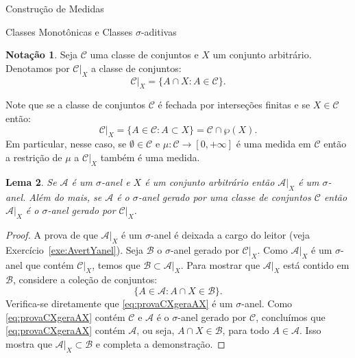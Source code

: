\documentclass[oneside,final,11pt]{amsbook}
\theoremstyle{remark}\newtheorem{exercise}{Exercício}[chapter]
\theoremstyle{remark}\newtheorem{*exercise}[exercise]{\hbox to 0pt{\hskip 0pt minus 1fil*}Exercício}
\theoremstyle{definition}\newtheorem{exdefin}{Definição}[chapter]
\theoremstyle{plain}\newtheorem{teo}{Teorema}[section]
\theoremstyle{plain}\newtheorem{lem}[teo]{Lema}
\theoremstyle{plain}\newtheorem{prop}[teo]{Proposição}
\theoremstyle{plain}\newtheorem{cor}[teo]{Corolário}
\theoremstyle{definition}\newtheorem{defin}[teo]{Definição}
\theoremstyle{remark}\newtheorem{rem}[teo]{Observação}
\theoremstyle{definition}\newtheorem{notation}[teo]{Notação}
\theoremstyle{definition}\newtheorem{convention}[teo]{Convenção}
\theoremstyle{definition}\newtheorem{example}[teo]{Exemplo}
\numberwithin{section}{chapter}
\numberwithin{equation}{section}
\begin{document}
\begin{chapter}{Construção de Medidas}
\begin{section}{Classes Monotônicas e Classes ${\sigma}$-aditivas}
\begin{notation}
Seja $\mathcal C$ uma classe de conjuntos e $X$ um conjunto arbitrário. Denotamos
por $\mathcal C\vert_X$ a classe de conjuntos:
\[\mathcal C\vert_X=\big\{A\cap X:A\in\mathcal C\big\}.\]
\end{notation}
Note que se a classe de conjuntos $\mathcal C$ é fechada por interseções finitas
e se $X\in\mathcal C$ então:
\[\mathcal C\vert_X=\big\{A\in\mathcal C:A\subset X\big\}=\mathcal C\cap\wp(X).\]
Em particular, nesse caso, se $\emptyset\in\mathcal C$ e $\mu:\mathcal C\to[0,+\infty]$
é uma medida em $\mathcal C$ então a restrição de $\mu$ a $\mathcal C\vert_X$ também
é uma medida.

\begin{lem}\label{thm:gerarestr}
Se $\mathcal A$ é um $\sigma$-anel e $X$ é um conjunto arbitrário então $\mathcal A\vert_X$
é um $\sigma$-anel. Além do mais, se $\mathcal A$ é o $\sigma$-anel gerado por uma classe
de conjuntos $\mathcal C$ então $\mathcal A\vert_X$ é o $\sigma$-anel gerado por
$\mathcal C\vert_X$.
\end{lem}
\begin{proof}
A prova de que $\mathcal A\vert_X$ é um $\sigma$-anel é deixada a cargo do leitor
(veja Exercício~\ref{exe:AvertYanel}). Seja $\mathcal B$ o $\sigma$-anel gerado
por $\mathcal C\vert_X$. Como $\mathcal A\vert_X$ é um $\sigma$-anel que contém $\mathcal C\vert_X$,
temos que $\mathcal B\subset\mathcal A\vert_X$. Para mostrar que $\mathcal A\vert_X$
está contido em $\mathcal B$, considere a coleção de conjuntos:
\begin{equation}\label{eq:provaCXgeraAX}
\big\{A\in\mathcal A:A\cap X\in\mathcal B\big\}.
\end{equation}
Verifica-se diretamente que \eqref{eq:provaCXgeraAX} é um $\sigma$-anel. Como
\eqref{eq:provaCXgeraAX} contém $\mathcal C$ e $\mathcal A$ é o $\sigma$-anel
gerado por $\mathcal C$, concluímos que \eqref{eq:provaCXgeraAX} contém $\mathcal A$,
ou seja, $A\cap X\in\mathcal B$, para todo $A\in\mathcal A$. Isso mostra que
$\mathcal A\vert_X\subset\mathcal B$ e completa a demonstração.
\end{proof}


\end{section}
\end{chapter}
\end{document}
